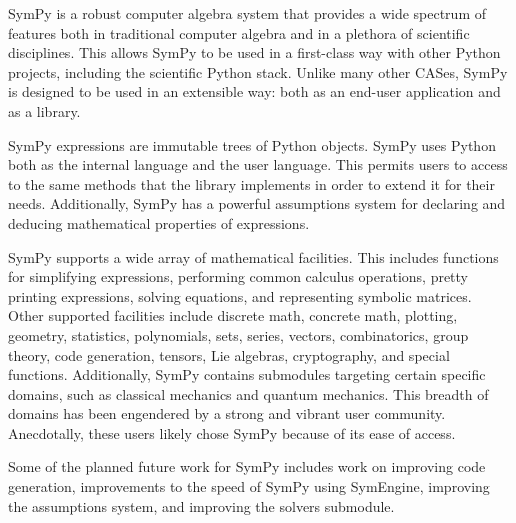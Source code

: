 SymPy is a robust computer algebra system that provides a wide spectrum of
features both in traditional computer algebra and in a plethora of scientific
disciplines. This allows SymPy to be used in a first-class way with other
Python projects, including the scientific Python stack. Unlike many other CASes, SymPy
is designed to be used in an extensible way: both as an end-user
application and as a library.

SymPy expressions are immutable trees of Python objects. SymPy uses Python both
as the internal language and the user language. This permits users to access to
the same
methods that the library implements in order to extend it for their needs.
Additionally, SymPy has a powerful assumptions
system for declaring and deducing mathematical properties of expressions.

SymPy supports a wide array of mathematical facilities. This includes functions for
simplifying expressions, performing common calculus operations, pretty printing
expressions, solving equations, and representing symbolic matrices. Other supported
facilities
include discrete math, concrete math, plotting, geometry, statistics,
polynomials, sets, series, vectors, combinatorics, group theory, code
generation, tensors, Lie algebras, cryptography, and special functions.
Additionally, SymPy contains submodules targeting certain specific domains,
such as classical mechanics and quantum mechanics.  This breadth of domains has
been engendered by a strong and vibrant user community.
Anecdotally, these users likely chose SymPy because of its ease of access.


Some of the planned future work for SymPy includes work on improving code
generation, improvements to the speed of SymPy using SymEngine, improving the
assumptions system, and improving the solvers submodule.


